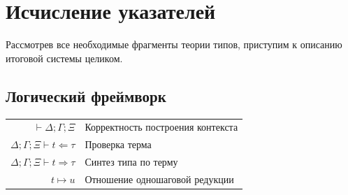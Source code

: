 \documentclass[12pt]{article}
\DeclareMathOperator{\type}{type}
\begin{document}
\section{Исчисление указателей}

Рассмотрев все необходимые фрагменты теории типов, приступим к описанию итоговой
системы целиком.

\subsection{Логический фреймворк}

\begin{center}
\begin{tabular}{rl}
  $\vdash\Delta;\Gamma;\Xi$&Корректность построения контекста\\
  $\Delta;\Gamma;\Xi\vdash t\Leftarrow\tau$&Проверка терма\\
  $\Delta;\Gamma;\Xi\vdash t\Rightarrow\tau$&Синтез типа по терму\\
  $t\mapsto u$&Отношение одношаговой редукции
\end{tabular}
\end{center}
\end{document}
